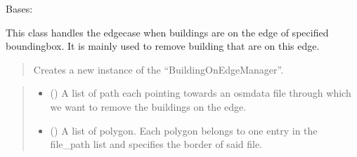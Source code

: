 \documentclass[letterpaper,10pt,english]{sphinxmanual}
\begin{document}
\begin{fulllineitems}
\label{\detokenize{apidoc/src.osm_configurator.model.project.calculation:src.osm_configurator.model.project.calculation.building_on_edge_manager.BuildingOnEdgeManager}}
\pysigstartsignatures
{}
\pysigstopsignatures
\sphinxAtStartPar
Bases: 

\sphinxAtStartPar
This class handles the edge\sphinxhyphen{}case when buildings are on the edge of
specified bounding\sphinxhyphen{}box.
It is mainly used to remove building that are on this edge.

\begin{fulllineitems}
\label{\detokenize{apidoc/src.osm_configurator.model.project.calculation:src.osm_configurator.model.project.calculation.building_on_edge_manager.BuildingOnEdgeManager.__init__}}
\pysigstartsignatures
{}
\pysigstopsignatures\begin{quote}

\sphinxAtStartPar
Creates a new instance of the “BuildingOnEdgeManager”.
\end{quote}
\begin{quote}\begin{description}
\begin{itemize}
\item {} 
\sphinxAtStartPar
{} (\sphinxstyleliteralemphasis{\sphinxupquote{{[}}}\sphinxstyleliteralemphasis{\sphinxupquote{{]}}}) \textendash{} A list of path each pointing towards an osm\sphinxhyphen{}data file through which we want
to remove the buildings on the edge.

\item {} 
\sphinxAtStartPar
{} (\sphinxstyleliteralemphasis{\sphinxupquote{{[}}}\sphinxstyleliteralemphasis{\sphinxupquote{{]}}}) \textendash{} A list of polygon. Each polygon belongs to one entry in the file\_path list
and specifies the border of said file.


\end{itemize}
\end{description}
\end{quote}
\end{fulllineitems}
\end{fulllineitems}
\end{document}
